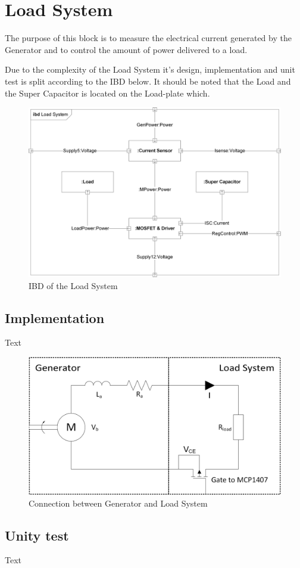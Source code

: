 \newpage
\section{Load System}
The purpose of this block is to measure the electrical current generated by the Generator and to control the amount of power delivered to a load.

Due to the complexity of the Load System it's design, implementation and unit test is split according to the IBD below. It should be noted that the Load and the Super Capacitor is located on the Load-plate which.

\begin{figure}[H]
	\centering
	\includegraphics[width=0.7\linewidth]{Hardware/Pictures/IBD_LoadSystem}
	\caption{IBD of the Load System}
	\label{fig:IBD_Load_System}
\end{figure}






\subsection{Implementation}
Text

\begin{figure}[H]
	\centering
	\includegraphics[width=0.7\linewidth]{Hardware/Pictures/LoadSystem}
	\caption{Connection between Generator and Load System}
	\label{fig:Load_System}
\end{figure}

\subsection{Unity test}
Text